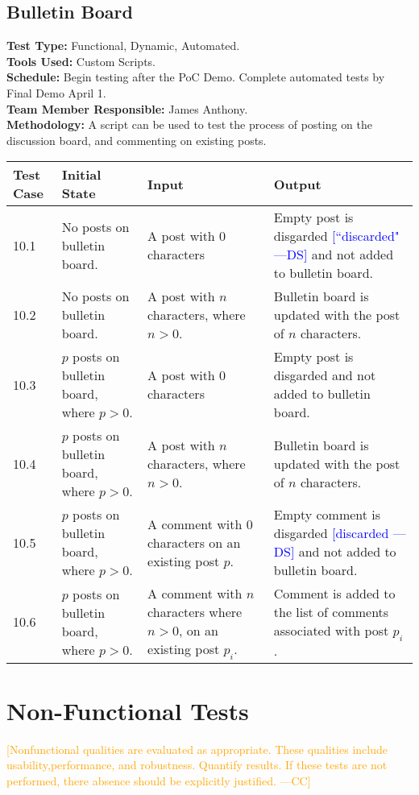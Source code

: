 \documentclass[12pt]{article}
\newcommand{\authornote}[3]{\textcolor{#1}{[#3 ---#2]}}
\newcommand{\authornote}[3]{}
\newcommand{\ds}[1]{\authornote{blue}{DS}{#1}}
\newcommand{\cc}[1]{\authornote{orange}{CC}{#1}}
\begin{document}
\subsection{Bulletin Board}
\textbf{Test Type:} Functional, Dynamic, Automated. \\
\textbf{Tools Used:} Custom Scripts. \\
\textbf{Schedule:} Begin testing after the PoC Demo. Complete automated tests by Final Demo April 1. \\
\textbf{Team Member Responsible:} James Anthony. \\
\textbf{Methodology:} A script can be used to test the process of posting on the discussion board, and commenting on existing posts.

\begin{longtable}{|p{2cm}|p{3cm}|p{5cm}|p{5cm}|}
\hline
\textbf{Test Case} & \textbf{Initial State} & \textbf{Input} & \textbf{Output} \\ \hline
10.1 & No posts on bulletin board. & A post with 0 characters & Empty post is disgarded
\ds{``discarded"}
and not added to bulletin board.\\
\hline
10.2 & No posts on bulletin board. & A post with $n$ characters, where $n > 0$. & Bulletin board is updated with the post of $n$ characters.\\
\hline
10.3 & $p$ posts on bulletin board, where $p > 0$. & A post with 0 characters & Empty post is disgarded and not added to bulletin board.\\
\hline
10.4 & $p$ posts on bulletin board, where $p > 0$. & A post with $n$ characters, where $n > 0$. & Bulletin board is updated with the post of $n$ characters.\\
\hline
10.5 & $p$ posts on bulletin board, where $p > 0$. & A comment with 0 characters on an existing post $p$. & Empty comment is disgarded
\ds{discarded}
and not added to bulletin board.\\
\hline
10.6 & $p$ posts on bulletin board, where $p > 0$. & A comment with $n$ characters where $n > 0$, on an existing post $p_i$. & Comment is added to the list of comments associated with post $p_i$.\\
\hline
\end{longtable}


\section{Non-Functional Tests}
\cc{Nonfunctional qualities are evaluated as appropriate.  These qualities include usability,performance, and robustness.  Quantify results. If these tests are not performed, there absence should be explicitly justified.}
\end{document}
